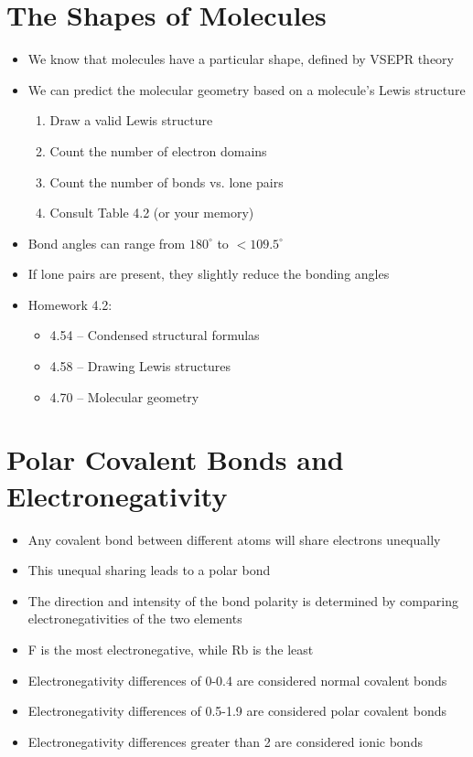 \documentclass[12pt, openany, letterpaper]{memoir}
\begin{document}
\section{The Shapes of Molecules}
\begin{itemize}
	\item We know that molecules have a particular shape, defined by VSEPR theory
	\item We can predict the molecular geometry based on a molecule's Lewis structure
	      \begin{enumerate}
		      \item Draw a valid Lewis structure
		      \item Count the number of electron domains
		      \item Count the number of bonds vs. lone pairs
		      \item Consult Table 4.2 (or your memory)
	      \end{enumerate}
	\item Bond angles can range from $180^\circ$ to $<109.5^\circ$
	\item If lone pairs are present, they slightly reduce the bonding angles
	\item Homework 4.2:
	      \begin{itemize}
		      \item 4.54 -- Condensed structural formulas
		      \item 4.58 -- Drawing Lewis structures
		      \item 4.70 -- Molecular geometry
	      \end{itemize}
\end{itemize}
\section{Polar Covalent Bonds and Electronegativity}
\begin{itemize}
	\item Any covalent bond between different atoms will share electrons unequally
	\item This unequal sharing leads to a polar bond
	\item The direction and intensity of the bond polarity is determined by comparing electronegativities of the two elements
	\item F is the most electronegative, while Rb is the least
	\item Electronegativity differences of 0-0.4 are considered normal covalent bonds
	\item Electronegativity differences of 0.5-1.9 are considered polar covalent bonds
	\item Electronegativity differences greater than 2 are considered ionic bonds
\end{itemize}
\end{document}
